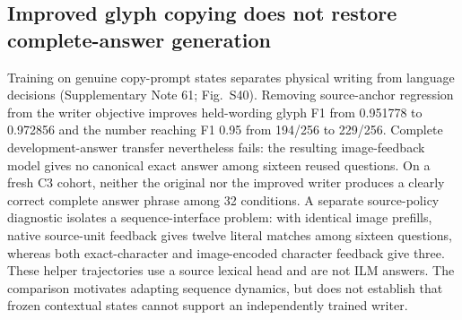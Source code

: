 \subsection*{Improved glyph copying does not restore complete-answer generation}
Training on genuine copy-prompt states separates physical writing from language
decisions (Supplementary Note 61; Fig.~S40). Removing source-anchor regression from the
writer objective improves held-wording glyph F1 from 0.951778 to 0.972856 and
the number reaching F1 0.95 from 194/256 to 229/256. Complete development-answer
transfer nevertheless fails: the resulting image-feedback model gives no
canonical exact answer among sixteen reused questions. On a fresh C3 cohort,
neither the original nor the improved writer produces a clearly correct
complete answer phrase among 32 conditions. A separate source-policy diagnostic
isolates a sequence-interface problem: with identical image prefills, native
source-unit feedback gives twelve literal matches among sixteen questions,
whereas both exact-character and image-encoded character feedback give three.
These helper trajectories use a source lexical head and are not ILM answers.
The comparison motivates adapting sequence dynamics, but does not establish
that frozen contextual states cannot support an independently trained writer.

